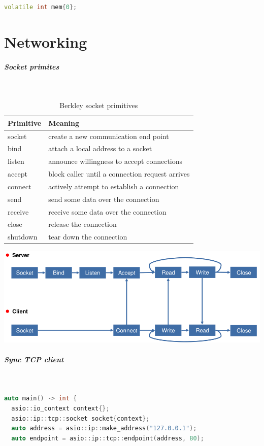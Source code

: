 \documentclass[11pt,twoside,landscape]{article}
\begin{document}
\begin{multicols}{2}
\begin{lstlisting}[language=c++,numbers=none]
volatile int mem{0};
\end{lstlisting}

\section{Networking}
\label{sec:org4c84903}
\subparagraph{Socket primites} \
\label{sec:org5bcb68a}
\begin{table}[htbp]
\caption{\label{tab:orgf26398b}Berkley socket primitives}
\centering
\begin{tabular}{ll}
Primitive & Meaning\\[0pt]
\hline
socket & create a new communication end point\\[0pt]
bind & attach a local address to a socket\\[0pt]
listen & announce willingness to accept connections\\[0pt]
accept & block caller until a connection request arrives\\[0pt]
connect & actively attempt to establish a connection\\[0pt]
send & send some data over the connection\\[0pt]
receive & receive some data over the connection\\[0pt]
close & release the connection\\[0pt]
shutdown & tear down the connection\\[0pt]
\end{tabular}
\end{table}

{
\begin{center}
\includegraphics[width=.9\linewidth]{img/connection_oriented_communication_pattern.png}
\end{center}
\label{tbl:connection-oriented-communication-pattern-using-sockets}
}
\subparagraph{Sync TCP client} \
\label{sec:org182fb4d}
\begin{lstlisting}[language=c++,label=lst:org3ddee7e,caption={Client connection example using ASIO},captionpos=b,numbers=none]
auto main() -> int {
  asio::io_context context{};
  asio::ip::tcp::socket socket{context};
  auto address = asio::ip::make_address("127.0.0.1");
  auto endpoint = asio::ip::tcp::endpoint(address, 80);


\end{lstlisting}
\end{multicols}
\end{document}
